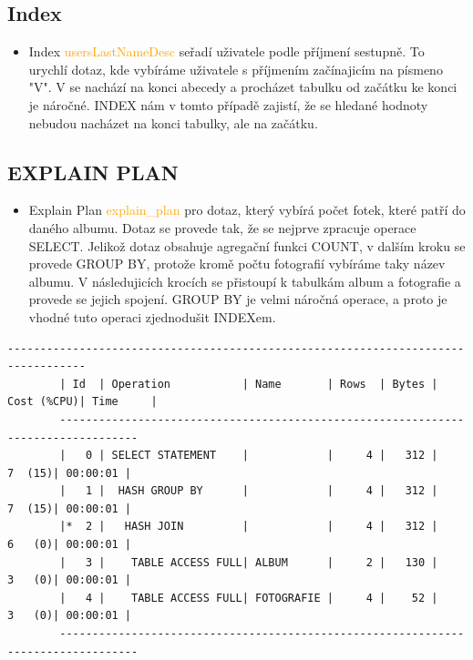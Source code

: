 \documentclass[11pt,a4paper]{article}
\begin{document}
    \subsection{Index}
        \begin{itemize}
            \item Index \textcolor{orange}{usersLastNameDesc} seřadí uživatele podle příjmení sestupně. To urychlí dotaz, kde vybíráme uživatele s příjmením začínajicím na písmeno "V". V se nachází na konci abecedy a procházet tabulku od začátku ke konci je náročné. INDEX nám v tomto případě zajistí, že se hledané hodnoty nebudou nacházet na konci tabulky, ale na začátku.
        \end{itemize}
    \newpage
    \subsection{EXPLAIN PLAN}
        \begin{itemize}
            \item Explain Plan \textcolor{orange}{explain\_plan} pro dotaz, který vybírá počet fotek, které patří do daného albumu. Dotaz se provede tak, že se nejprve zpracuje operace SELECT. Jelikož dotaz obsahuje agregační funkci COUNT, v dalším kroku se provede GROUP BY, protože kromě počtu fotografií vybíráme taky název albumu. V následujicích krocích se přistoupí k tabulkám album a fotografie a provede se jejich spojení. GROUP BY je velmi náročná operace, a proto je vhodné tuto operaci zjednodušit INDEXem.
        \end{itemize}
        \begin{Verbatim}[fontsize=\small]
        ----------------------------------------------------------------------------------
        | Id  | Operation           | Name       | Rows  | Bytes | Cost (%CPU)| Time     |
        ----------------------------------------------------------------------------------
        |   0 | SELECT STATEMENT    |            |     4 |   312 |     7  (15)| 00:00:01 |
        |   1 |  HASH GROUP BY      |            |     4 |   312 |     7  (15)| 00:00:01 |
        |*  2 |   HASH JOIN         |            |     4 |   312 |     6   (0)| 00:00:01 |
        |   3 |    TABLE ACCESS FULL| ALBUM      |     2 |   130 |     3   (0)| 00:00:01 |
        |   4 |    TABLE ACCESS FULL| FOTOGRAFIE |     4 |    52 |     3   (0)| 00:00:01 |
        ----------------------------------------------------------------------------------
        \end{Verbatim}
        
\end{document}
